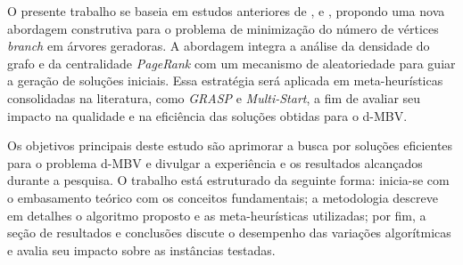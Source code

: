O presente trabalho se baseia em estudos anteriores de \cite{silva2024ils}, \cite{lima2024ils} e \cite{oliveira:2023}, propondo uma nova abordagem construtiva para o problema de minimização do número de vértices \textit{branch} em árvores geradoras. A abordagem integra a análise da densidade do grafo e da centralidade \textit{PageRank} com um mecanismo de aleatoriedade para guiar a geração de soluções iniciais. Essa estratégia será aplicada em meta-heurísticas consolidadas na literatura, como \textit{GRASP} e \textit{Multi-Start}, a fim de avaliar seu impacto na qualidade e na eficiência das soluções obtidas para o d-MBV.

Os objetivos principais deste estudo são aprimorar a busca por soluções eficientes para o problema d-MBV e divulgar a experiência e os resultados alcançados durante a pesquisa. O trabalho está estruturado da seguinte forma: inicia-se com o embasamento teórico com os conceitos fundamentais; a metodologia descreve em detalhes o algoritmo proposto e as meta-heurísticas utilizadas; por fim, a seção de resultados e conclusões discute o desempenho das variações algorítmicas e avalia seu impacto sobre as instâncias testadas. 

